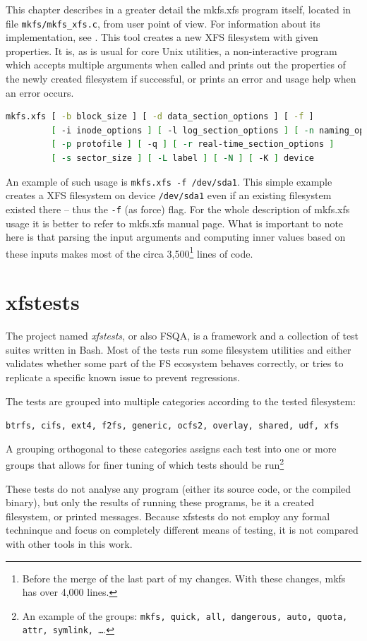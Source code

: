 This chapter describes in a greater detail the mkfs.xfs program itself, located
in file {\tt mkfs/mkfs\_xfs.c}, from user point of view. For information about
its implementation, see . This
tool creates a new XFS filesystem with given properties. It is, as is usual for
core Unix utilities, a non-interactive program which accepts multiple arguments
when called and prints out the properties of the newly created filesystem if
successful, or prints an error and usage help when an error occurs.

\begin{lstlisting}[frame=none, basicstyle=\footnotesize\ttfamily, language=Bash, numbers=none, numberstyle=\tiny\color{black},caption= {Synopsis of mkfs.xfs utility~\cite{mkfs.xfsMan}.}]
mkfs.xfs [ -b block_size ] [ -d data_section_options ] [ -f ]
         [ -i inode_options ] [ -l log_section_options ] [ -n naming_options ]
         [ -p protofile ] [ -q ] [ -r real-time_section_options ]
         [ -s sector_size ] [ -L label ] [ -N ] [ -K ] device
\end{lstlisting}

An example of such usage is {\tt mkfs.xfs -f /dev/sda1}. This simple example creates a XFS filesystem on device {\tt /dev/sda1} even if an existing filesystem existed there -- thus the {\tt -f} (as force) flag. For the whole description of mkfs.xfs usage it is better to refer to mkfs.xfs manual page. What is important to note here is that parsing the input arguments and computing inner values based on these inputs makes most of the circa 3,500\footnote{Before the merge of the last part of my changes. With these changes, mkfs has over 4,000 lines.} lines of code.


\section{xfstests}\label{chap:xfs:xfstests}

The project named {\em xfstests}, or also FSQA, is a framework and a
collection of test suites written in Bash. Most of the tests run some
filesystem utilities and either validates whether some part of the FS
ecosystem behaves correctly, or tries to replicate a specific known issue
to prevent regressions.

The tests are grouped into multiple categories according to the tested filesystem:

{\tt btrfs, cifs, ext4, f2fs, generic, ocfs2, overlay, shared, udf, xfs}

A grouping orthogonal to these categories assigns each test into one or
more groups that allows for finer tuning of which tests should be
run\footnote{An example of the groups: {\tt mkfs, quick, all, dangerous,
auto, quota, attr, symlink, \ldots}.}

These tests do not analyse any program (either its source code, or the
compiled binary), but only the results of running these programs, be it a
created filesystem, or printed messages. Because xfstests do not employ any
formal techninque and focus on completely different means of testing, it is
not compared with other tools in this work.
